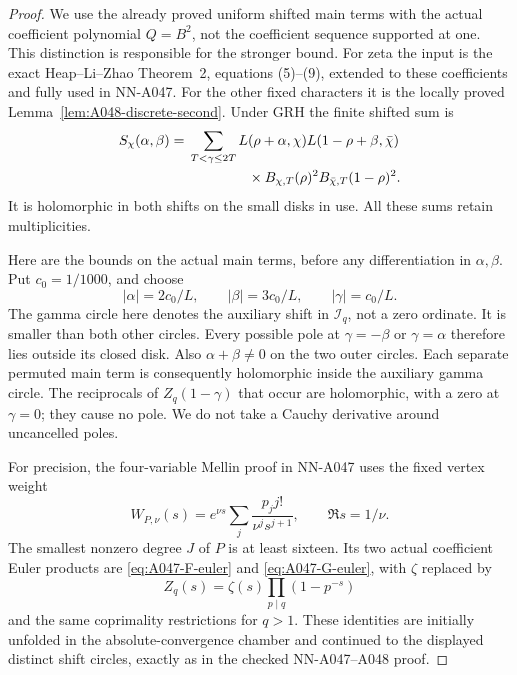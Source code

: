 \begin{proof}
We use the already proved uniform shifted main terms with the
actual coefficient polynomial \(Q=B^2\), not the coefficient
sequence supported at one. This distinction is responsible
for the stronger bound.
For zeta the input is the exact Heap--Li--Zhao Theorem~2,
equations (5)--(9), extended to these coefficients and
fully used in NN-A047. For the other fixed characters it is
the locally proved Lemma~\ref{lem:A048-discrete-second}.
Under GRH the finite shifted sum is
\begin{align*}
 S_\chi(\alpha,\beta)
   ={}&\sum_{T<\gamma\le2T}
       L(\rho+\alpha,\chi)L(1-\rho+\beta,\bar\chi)\\
      &\hspace{15mm}{}\times
                 B_{\chi,T}(\rho)^2B_{\bar\chi,T}(1-\rho)^2.
\end{align*}
It is holomorphic in both shifts on the small disks in use.
All these sums retain multiplicities.

Here are the bounds on the actual main terms, before any
differentiation in \(\alpha,\beta\). Put \(c_0=1/1000\),
and choose
\[
 |\alpha|=2c_0/L,\qquad |\beta|=3c_0/L,\qquad
 |\gamma|=c_0/L.
\]
The gamma circle here denotes the auxiliary shift in
\(\mathcal I_q\), not a zero ordinate. It is smaller than
both other circles. Every possible pole at
\(\gamma=-\beta\) or \(\gamma=\alpha\) therefore lies
outside its closed disk. Also \(\alpha+\beta\ne0\)
on the two outer circles. Each separate permuted main
term is consequently holomorphic inside the auxiliary
gamma circle. The reciprocals of \(Z_q(1-\gamma)\)
that occur are holomorphic, with a zero at \(\gamma=0\);
they cause no pole. We do not take a Cauchy derivative
around uncancelled poles.

For precision, the four-variable Mellin proof in NN-A047
uses the fixed vertex weight
\[
 W_{P,\nu}(s)=e^{\nu s}
                 \sum_j\frac{p_jj!}{\nu^js^{j+1}},
                       \qquad \Re s=1/\nu.
\]
The smallest nonzero degree \(J\) of \(P\) is at least sixteen.
Its two actual coefficient Euler products are
\eqref{eq:A047-F-euler} and \eqref{eq:A047-G-euler}, with
\(\zeta\) replaced by
\[
                 Z_q(s)=\zeta(s)\prod_{p\mid q}(1-p^{-s})
\]
and the same coprimality restrictions for \(q>1\).
These identities are initially unfolded in the
absolute-convergence chamber and continued to the
displayed distinct shift circles, exactly as in the
checked NN-A047--A048 proof.


\end{proof}
